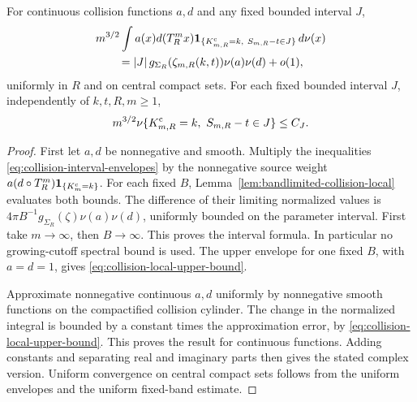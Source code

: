 \begin{theorem}
\label{thm:two-endpoint-collision-LLT}
For continuous collision functions $a,d$ and any fixed bounded interval
$J$,
\begin{align}
 &m^{3/2}\int a(x)d(T_R^m x)
 \one_{\{K^{\rm c}_{m,R}=k,\ S_{m,R}-t\in J\}}\,d\nu(x)
 \notag\\
 &\qquad =|J|\,g_{\Sigma_R}(\zeta_{m,R}(k,t))\nu(a)\nu(d)+o(1),
 \label{eq:two-endpoint-collision-LLT}
\end{align}
uniformly in $R$ and on central compact sets. For each fixed bounded
interval $J$, independently of $k,t,R,m\ge1$,
\begin{equation}\label{eq:collision-local-upper-bound}
 m^{3/2}\nu\{K^{\rm c}_{m,R}=k,\ S_{m,R}-t\in J\}\le C_J.
\end{equation}
\end{theorem}
\begin{proof}
First let $a,d$ be nonnegative and smooth. Multiply the inequalities
\eqref{eq:collision-interval-envelopes} by the nonnegative source
weight $a(d\circ T_R^m)\mathbf1_{\{K_m^{\rm c}=k\}}$. For each fixed
$B$, Lemma~\ref{lem:bandlimited-collision-local} evaluates both bounds.
The difference of their limiting normalized values is
$4\pi B^{-1}g_{\Sigma_R}(\zeta)\nu(a)\nu(d)$, uniformly bounded
on the parameter interval. First take $m\to\infty$, then $B\to\infty$.
This proves the interval formula. In particular no growing-cutoff
spectral bound is used. The upper envelope for one fixed $B$, with
$a=d=1$, gives \eqref{eq:collision-local-upper-bound}.

Approximate nonnegative continuous $a,d$ uniformly by nonnegative
smooth functions on the compactified collision cylinder. The change
in the normalized integral is bounded by a constant times the
approximation error, by \eqref{eq:collision-local-upper-bound}.
This proves the result for continuous functions. Adding constants and
separating real and imaginary parts then gives the stated complex
version. Uniform convergence on central compact sets follows from the
uniform envelopes and the uniform fixed-band estimate.
\end{proof}

